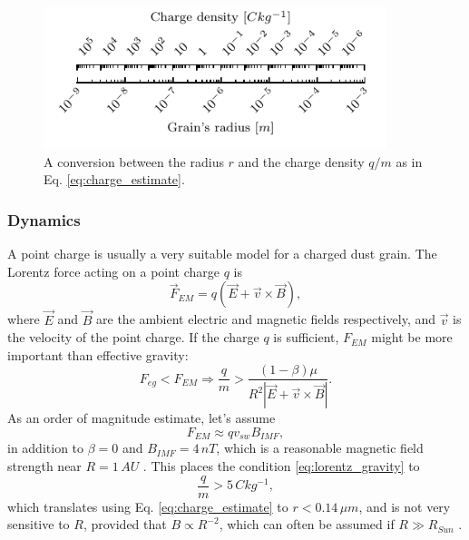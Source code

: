 \begin{figure}[h]
 	\centering
 	\includegraphics[width=10cm]{figures/charge_density_ruler.pdf}
 	\caption{A conversion between the radius $r$ and the charge density $q/m$ as in Eq. \ref{eq:charge_estimate}.}
 	\label{fig:charge_density_ruler}
\end{figure}

\subsubsection{Dynamics}

A point charge is usually a very suitable model for a charged dust grain. The Lorentz force acting on a point charge $q$ is
\begin{equation}
\vec{F}_{EM} = q \left( \vec{E} + \vec{v} \times \vec{B} \right),
\end{equation}
where $\vec{E}$ and $\vec{B}$ are the ambient electric and magnetic fields respectively, and $\vec{v}$ is the velocity of the point charge. If the charge $q$ is sufficient, $F_{EM}$ might be more important than effective gravity:
\begin{equation}
    F_{eg} < F_{EM} \Rightarrow \frac{q}{m} > \frac{(1-\beta)\mu}{R^2 \left| \vec{E} + \vec{v} \times \vec{B} \right|}. \label{eq:lorentz_gravity}
\end{equation}
As an order of magnitude estimate, let's assume 
\begin{equation}
    F_{EM} \approx q v_{sw} B_{IMF},
\end{equation}
in addition to $\beta = 0$ and $B_{IMF} = 4 \, \si{nT}$, which is a reasonable magnetic field strength near $R = 1 \, \si{AU}$ \citep{mann2007nanoparticles}. This places the condition \ref{eq:lorentz_gravity} to
\begin{equation}
    \frac{q}{m} > 5 \, \si{C kg^{-1}},
\end{equation}
which translates using Eq. \ref{eq:charge_estimate} to $r < 0.14 \, \si{\mu m}$, and is not very sensitive to $R$, provided that $B \propto R^{-2}$, which can often be assumed if $R \gg R_{Sun}$ \citep{parker1958dynamics}.  

